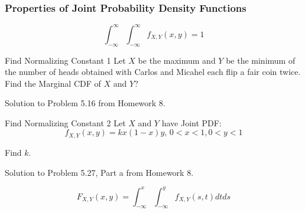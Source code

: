 		\subsubsection{Properties of Joint Probability Density Functions} \label{subsubsec:Joint PDF Properties}
			\begin{propertylist}
				\item 
					\begin{equation}
						\int_{-\infty}^{\infty} \int_{-\infty}^{\infty} f_{X,Y} \left( x,y \right) = 1
					\end{equation}
			\end{propertylist}
                        \begin{example}[Example 5.16]{Find Normalizing Constant 1}
                          Let $X$ be the maximum and $Y$ be the minimum of the number of heads obtained with Carlos and Micahel each flip a fair coin twice.
                          Find the Marginal CDF of $X$ and $Y$?

                          \tcblower

                          Solution to Problem 5.16 from Homework 8.
                        \end{example}
				\begin{example}[Problem 5.27]{Find Normalizing Constant 2}
					Let $X$ and $Y$ have Joint PDF:
					\begin{equation*}
						f_{X,Y} \left( x,y \right) = k x \left( 1-x \right) y \text{, } 0<x<1, 0<y<1
					\end{equation*}
					\begin{boldalphlist}
						\item Find $k$.
					\end{boldalphlist}
					
					\tcblower
					
					Solution to Problem 5.27, Part a from Homework 8.
				\end{example}
			\begin{propertylist}[resume]
				\item 
					\begin{equation}
						F_{X,Y} \left( x,y \right) = \int_{-\infty}^{x} \int_{-\infty}^{y} f_{X,Y} \left( s,t \right) dt ds
					\end{equation}
			\end{propertylist}
